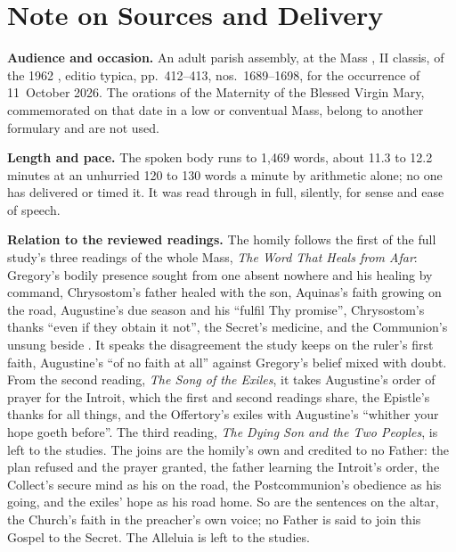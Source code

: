 
\section*{Note on Sources and Delivery}

{\footnotesize

\textbf{Audience and occasion.} An adult parish assembly, at the Mass
, II classis, of the 1962
, editio typica, pp.~412--413, nos.~1689--1698, for the
occurrence of 11~October 2026. The orations of the Maternity of the Blessed
Virgin Mary, commemorated on that date in a low or conventual Mass, belong to
another formulary and are not used.

\textbf{Length and pace.} The spoken body runs to 1,469 words, about 11.3 to
12.2 minutes at an unhurried 120 to 130 words a minute by arithmetic alone; no
one has delivered or timed it. It was read through in full, silently, for sense
and ease of speech.

\textbf{Relation to the reviewed readings.} The homily follows the first of the
full study's three readings of the whole Mass, \textit{The Word That Heals from
Afar}: Gregory's bodily presence sought from one absent nowhere and his healing
by command, Chrysostom's father healed with the son, Aquinas's faith growing on
the road, Augustine's due season and his ``fulfil Thy promise'', Chrysostom's
thanks ``even if they obtain it not'', the Secret's medicine, and the
Communion's unsung  beside . It
speaks the disagreement the study keeps on the ruler's first faith, Augustine's
``of no faith at all'' against Gregory's belief mixed with doubt. From the
second reading, \textit{The Song of the Exiles}, it takes Augustine's order of
prayer for the Introit, which the first and second readings share, the
Epistle's thanks for all things, and the Offertory's exiles with Augustine's
``whither your hope goeth before''. The third reading, \textit{The Dying Son
and the Two Peoples}, is left to the studies. The joins are the homily's own and
credited to no Father: the plan refused and the prayer granted, the father
learning the Introit's order, the Collect's secure mind as his on the road, the
Postcommunion's obedience as his going, and the exiles' hope as his road home.
So are the sentences on the altar, the Church's faith in the preacher's own
voice; no Father is said to join this Gospel to the Secret. The Alleluia is left
to the studies.

}
